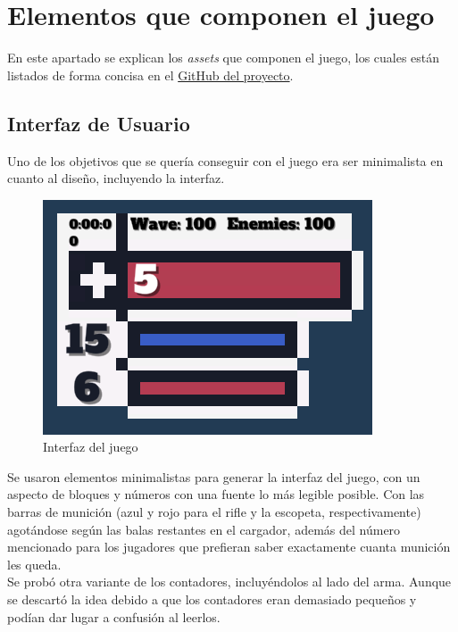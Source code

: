 \documentclass[11pt]{article}
\begin{document}
\section{Elementos que componen el juego}
    En este apartado se explican los \textit{assets} que componen el juego, los cuales están listados de forma concisa en el \href{https://github.com/JesusJMUJI/TopDownShooterGame}{GitHub del proyecto}. 
    
    \subsection{Interfaz de Usuario}
        Uno de los objetivos que se quería conseguir con el juego era ser minimalista en cuanto al diseño, incluyendo la interfaz.  
        \begin{figure}[H]
            \centering
            \includegraphics[scale = 0.7]{Images/UI.png}
            \caption{Interfaz del juego}
            \label{fig:UI}
        \end{figure}
        
        Se usaron elementos minimalistas para generar la interfaz del juego, con un aspecto de bloques y números con una fuente lo más legible posible. Con las barras de munición (azul y rojo para el rifle y la escopeta, respectivamente) agotándose según las balas restantes en el cargador, además del número mencionado para los jugadores que prefieran saber exactamente cuanta munición les queda.\\
        
        Se probó otra variante de los contadores, incluyéndolos al lado del arma. Aunque se descartó la idea debido a que los contadores eran demasiado pequeños y podían dar lugar a confusión al leerlos.\\
        
\end{document}
